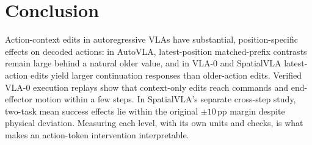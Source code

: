 \section{Conclusion}
Action-context edits in autoregressive VLAs have substantial, position-specific effects on decoded actions: in AutoVLA, latest-position matched-prefix contrasts remain large behind a natural older value, and in VLA-0 and SpatialVLA latest-action edits yield larger continuation responses than older-action edits. Verified VLA-0 execution replays show that context-only edits reach commands and end-effector motion within a few steps. In SpatialVLA's separate cross-step study, two-task mean success effects lie within the original $\pm10$\,pp margin despite physical deviation. Measuring each level, with its own units and checks, is what makes an action-token intervention interpretable.
